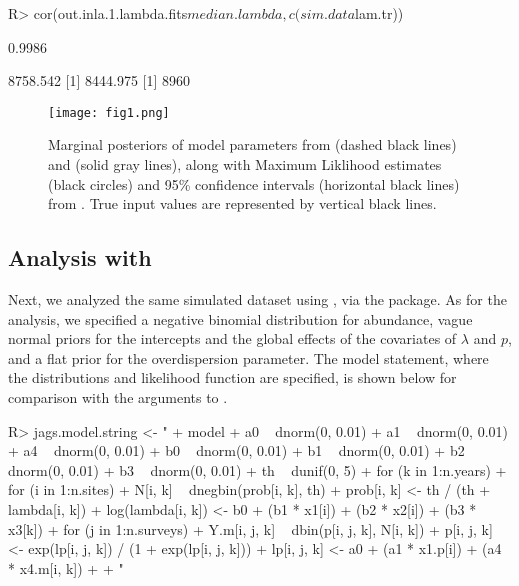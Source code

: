 \documentclass[codesnippet]{jss}
\begin{document}
\begin{CodeInput}
R> cor(out.inla.1.lambda.fits$median.lambda, c(sim.data$lam.tr))
\end{CodeInput}
\begin{CodeOutput}
[1] 0.9986
\end{CodeOutput}

\begin{CodeOutput}
[1] 8758.542
[1] 8444.975
[1] 8960
\end{CodeOutput}

\begin{figure}[p]
\texttt{[image: fig1.png]}
\caption{Marginal posteriors of model parameters from  (dashed black lines) and  (solid gray lines), along with Maximum Liklihood estimates (black circles) and 95\% confidence intervals (horizontal black lines) from .  True input values are represented by vertical black lines.}
\label{fig:fig1}
\end{figure}

\subsection[Analysis with JAGS]{Analysis with }
Next, we analyzed the same simulated dataset using , via the  package. As for the  analysis, we specified a negative binomial distribution for abundance, vague normal priors for the intercepts and the global effects of the covariates of $\lambda$ and $p$, and a flat prior for the overdispersion parameter.  The  model statement, where the distributions and likelihood function are specified, is shown below for comparison with the arguments to .

\begin{CodeInput}
R> jags.model.string <- "
+    model {
+      a0 ~ dnorm(0, 0.01)
+      a1 ~ dnorm(0, 0.01)
+      a4 ~ dnorm(0, 0.01)
+      b0 ~ dnorm(0, 0.01)
+      b1 ~ dnorm(0, 0.01)
+      b2 ~ dnorm(0, 0.01)
+      b3 ~ dnorm(0, 0.01)
+      th ~ dunif(0, 5)
+    for (k in 1:n.years){
+      for (i in 1:n.sites){
+        N[i, k] ~ dnegbin(prob[i, k], th)
+        prob[i, k] <- th / (th + lambda[i, k])
+        log(lambda[i, k]) <- b0 + (b1 * x1[i]) + (b2 * x2[i]) + (b3 * x3[k])
+        for (j in 1:n.surveys){
+          Y.m[i, j, k] ~ dbin(p[i, j, k], N[i, k])
+          p[i, j, k] <- exp(lp[i, j, k]) / (1 + exp(lp[i, j, k]))
+          lp[i, j, k] <- a0 + (a1 * x1.p[i]) + (a4 * x4.m[i, k])
+    }}}}
+  "
\end{CodeInput}
\end{document}
